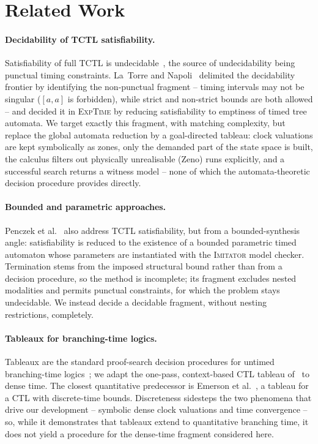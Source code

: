 \section{Related Work}\label{sec:related}

\paragraph{Decidability of TCTL satisfiability.}
Satisfiability of full TCTL is undecidable~\cite{AlurCourcoubetisDill1990,AlurHenzinger1994ReallyTemporal},
the source of undecidability being {punctual} timing constraints. La~Torre and
Napoli~\cite{fsttcs2000-LN,LaTorreNapoli2001TimedTreeAutomata} delimited the decidability frontier
by identifying the {non-punctual} fragment -- timing intervals may not be singular ($[a,a]$ is
forbidden), while strict and non-strict bounds are both allowed -- and decided it in \textsc{ExpTime}
by reducing satisfiability to emptiness of timed tree automata. We target exactly this fragment, with
matching complexity, but replace the global automata reduction by a goal-directed tableau: clock
valuations are kept symbolically as zones, only the demanded part of the state space is built, the
calculus filters out physically unrealisable (Zeno) runs explicitly, and a successful search returns
a witness model -- none of which the automata-theoretic decision procedure provides directly.

\paragraph{Bounded and parametric approaches.}
Penczek et al.~\cite{boundedTCTL} also address TCTL satisfiability, but from a bounded-synthesis
angle: satisfiability is reduced to the existence of a bounded parametric timed automaton whose
parameters are instantiated with the \textsc{Imitator} model checker. Termination stems from the
imposed structural bound rather than from a decision procedure, so the method is incomplete; its
fragment excludes nested modalities and permits punctual constraints, for which the problem stays
undecidable. We instead decide a decidable fragment, without nesting restrictions, completely.

\paragraph{Tableaux for branching-time logics.}
Tableaux are the standard proof-search decision procedures for untimed branching-time
logics~\cite{Clarke99,tableau_ctl}; we adapt the one-pass, context-based CTL tableau
of~\cite{tableau_ctl} to dense time. The closest quantitative predecessor is Emerson et
al.~\cite{EmersonEtAl1992QuantitativeTemporalReasoning}, a tableau for a CTL with {discrete}-time
bounds. Discreteness sidesteps the two phenomena that drive our development -- symbolic dense clock
valuations and time convergence -- so, while it demonstrates that tableaux extend to quantitative
branching time, it does not yield a procedure for the dense-time fragment considered here.

